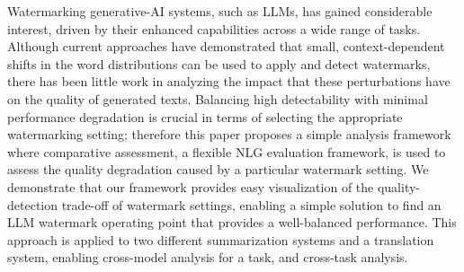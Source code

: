 Watermarking generative-AI systems, such as LLMs, has gained considerable interest, driven by their enhanced capabilities across a wide range of tasks. Although current approaches have demonstrated that small, context-dependent shifts in the word distributions can be used to apply and detect watermarks, there has been little work in analyzing the impact that these perturbations have on the quality of generated texts. Balancing high detectability with minimal performance degradation is crucial in terms of selecting the appropriate watermarking setting; therefore this paper proposes a simple analysis framework where comparative assessment, a flexible NLG evaluation framework, is used to assess the quality degradation caused by a particular watermark setting. We demonstrate that our framework provides easy visualization of the quality-detection trade-off of watermark settings, enabling a simple solution to find an LLM watermark operating point that provides a well-balanced performance. This approach is applied to two different summarization systems and a translation system, enabling cross-model analysis for a task, and cross-task analysis.